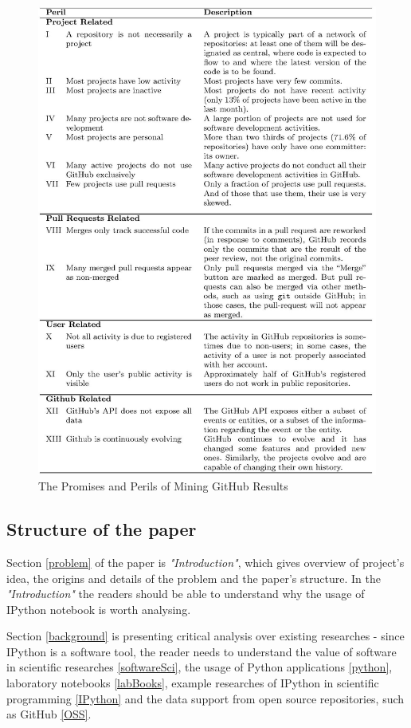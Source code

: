\begin{figure}
\centering
\includegraphics[scale=1.0]{images/file-page1}
\caption{The Promises and Perils of Mining GitHub Results}
\label{fig:github}
\end{figure}

\subsection{Structure of the paper}

Section \ref{problem} of the paper is \textit{"Introduction"}, which gives overview of project's idea, the origins and details of the problem and the paper's structure. In the \textit{"Introduction"} the readers should be able to understand why the usage of IPython notebook is worth analysing.

Section \ref{background} is presenting critical analysis over existing researches - since IPython is a software tool, the reader needs to understand the value of software in scientific researches \ref{softwareSci}, the usage of Python applications \ref{python}, laboratory notebooks \ref{labBooks}, example researches of IPython in scientific programming \ref{IPython} and the data support from open source repositories, such as GitHub \ref{OSS}. 


